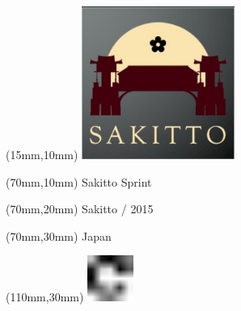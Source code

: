 \null\newpage
\begin{textblock*}{50mm}(15mm,10mm)%
\includegraphics[width=50mm]{LG/2015-05-20_00093.png}
\end{textblock*}
\begin{textblock*}{130mm}(70mm,10mm)%
{\fontsize{20}{20}\selectfont Sakitto Sprint}\\
\end{textblock*}
\begin{textblock*}{120mm}(70mm,20mm)%
{\fontsize{16}{16}\selectfont Sakitto / 2015}\\
\end{textblock*}
\begin{textblock*}{120mm}(70mm,30mm)%
{\fontsize{12}{12}\selectfont Japan}
\end{textblock*}
\begin{textblock*}{30mm}(110mm,30mm)%
\centering
\includegraphics[height=15mm]{icons/fa-rotate-right.pdf}
\end{textblock*}
